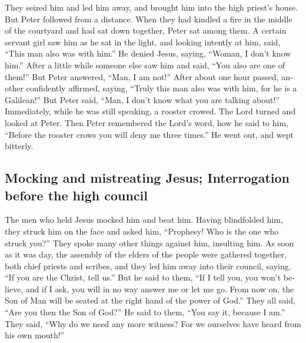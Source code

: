 \begin{paracol}{2}
\begin{otherlanguage}{english}
\begin{otherlanguage}{english}
 They seized him and led him away, and brought him into
the high priest's house. But Peter followed from a distance.
 When they had kindled a fire in the middle of the
courtyard and had sat down together, Peter sat among them.
 A certain servant girl saw him as he sat in the light,
and looking intently at him, said, ``This man also was with him.''
 He denied Jesus, saying, ``Woman, I don't know him.''
 After a little while someone else saw him and said,
``You also are one of them!'' But Peter answered, ``Man, I am not!''
 After about one hour passed, another confidently
affirmed, saying, ``Truly this man also was with him, for he is a
Galilean!''  But Peter said, ``Man, I don't know what you
are talking about!'' Immediately, while he was still speaking, a rooster
crowed.  The Lord turned and looked at Peter. Then Peter
remembered the Lord's word, how he said to him, ``Before the rooster
crows you will deny me three times.''  He went out, and
wept bitterly.

\hypertarget{mocking-and-mistreating-jesus-interrogation-before-the-high-council}{%
\subsection{Mocking and mistreating Jesus; Interrogation before the high
council}\label{mocking-and-mistreating-jesus-interrogation-before-the-high-council}}

 The men who held Jesus mocked him and beat him.
 Having blindfolded him, they struck him on the face and
asked him, ``Prophesy! Who is the one who struck you?'' 
They spoke many other things against him, insulting him. 
As soon as it was day, the assembly of the elders of the people were
gathered together, both chief priests and scribes, and they led him away
into their council, saying,  ``If you are the Christ,
tell us.'' But he said to them, ``If I tell you, you won't believe,
 and if I ask, you will in no way answer me or let me go.
 From now on, the Son of Man will be seated at the right
hand of the power of God.''  They all said, ``Are you
then the Son of God?'' He said to them, ``You say it, because I am.''
 They said, ``Why do we need any more witness? For we
ourselves have heard from his own mouth!''

\end{otherlanguage}


\end{otherlanguage}
\end{paracol}
